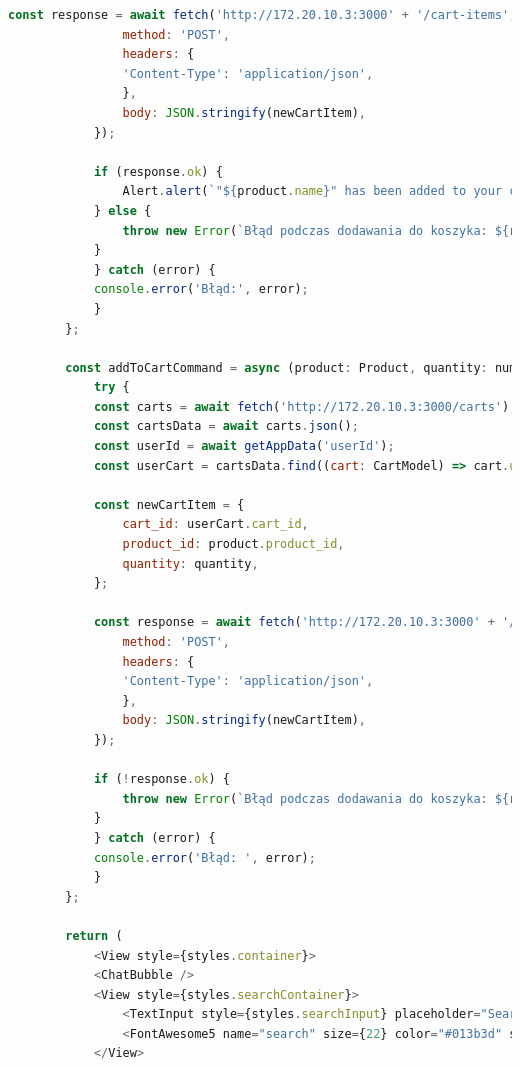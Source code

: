 \begin{lstlisting}[language=JavaScript, caption=Ekran produktów implementacja, label=lst:service]
            const response = await fetch('http://172.20.10.3:3000' + '/cart-items', {
                method: 'POST',
                headers: {
                'Content-Type': 'application/json',
                },
                body: JSON.stringify(newCartItem),
            });

            if (response.ok) {
                Alert.alert(`"${product.name}" has been added to your cart`);
            } else {
                throw new Error(`Błąd podczas dodawania do koszyka: ${response.statusText}`);
            }
            } catch (error) {
            console.error('Błąd:', error);
            }
        };

        const addToCartCommand = async (product: Product, quantity: number) => {
            try {
            const carts = await fetch('http://172.20.10.3:3000/carts');
            const cartsData = await carts.json();
            const userId = await getAppData('userId');
            const userCart = cartsData.find((cart: CartModel) => cart.user_id === userId);

            const newCartItem = {
                cart_id: userCart.cart_id,
                product_id: product.product_id,
                quantity: quantity,
            };

            const response = await fetch('http://172.20.10.3:3000' + '/cart-items', {
                method: 'POST',
                headers: {
                'Content-Type': 'application/json',
                },
                body: JSON.stringify(newCartItem),
            });

            if (!response.ok) {
                throw new Error(`Błąd podczas dodawania do koszyka: ${response.statusText}`);
            }
            } catch (error) {
            console.error('Błąd: ', error);
            }
        };

        return (
            <View style={styles.container}>
            <ChatBubble />
            <View style={styles.searchContainer}>
                <TextInput style={styles.searchInput} placeholder="Search products" value={searchQuery} onChangeText={handleSearch} selectionColor="#013b3d" />
                <FontAwesome5 name="search" size={22} color="#013b3d" style={styles.searchIcon} />
            </View>


\end{lstlisting}
